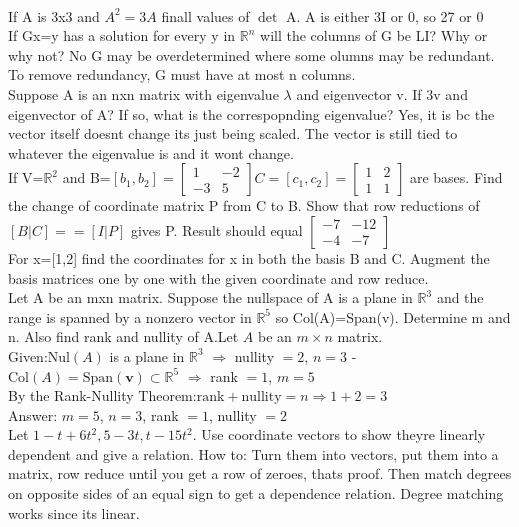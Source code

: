 \documentclass{article}
\begin{document}
\begin{multicols*}{2}
\\If A is 3x3 and $A^2=3A$ finall values of $\det$ A. A is either 3I or 0, so 27 or 0
\\If Gx=y has a solution for every y in $\mathbb{R}^n$ will the columns of G be LI? Why or why not? No G may be overdetermined where some olumns may be redundant. To remove redundancy, G must have at most n columns.
\\Suppose A is an nxn matrix with eigenvalue $\lambda$ and eigenvector v. If 3v and eigenvector of A? If so, what is the correspopnding eigenvalue? Yes, it is bc the vector itself doesnt change its just being scaled. The vector is still tied to whatever the eigenvalue is and it wont change.
\\If V=$\mathbb{R}^2$ and B=$[b_1,b_2]=\begin{bmatrix}1&-2\\-3&5\end{bmatrix}C=[c_1,c_2]=\begin{bmatrix}1&2\\1&1\end{bmatrix}$ are bases. Find the change of coordinate matrix P from C to B. Show that row reductions of $[B|C]==[I|P]$ gives P. Result should equal $\begin{bmatrix}-7&-12\\-4&-7\end{bmatrix}$
\\For x=[1,2] find the coordinates for x in both the basis B and C. Augment the basis matrices one by one with the given coordinate and row reduce.
\\Let A be an mxn matrix. Suppose the nullspace of A is a plane in $\mathbb{R}^3$ and the range is spanned by a nonzero vector in $\mathbb{R}^5$ so Col(A)=Span(v). Determine m and n. Also find rank and nullity of A.Let $A$ be an $m \times n$ matrix.\\
Given:$\text{Nul}(A)$ is a plane in $\mathbb{R}^3$ $\Rightarrow$ nullity $= 2$, $n = 3$
- $\text{Col}(A) = \text{Span}(\mathbf{v}) \subset \mathbb{R}^5$ $\Rightarrow$ rank $= 1$, $m = 5$
\\By the Rank-Nullity Theorem:$\text{rank} + \text{nullity} = n \Rightarrow 1 + 2 = 3$
\\Answer: $m = 5$, $n = 3$, rank $= 1$, nullity $= 2$
\\Let $1-t+6t^2, 5-3t, t-15t^2$. Use coordinate vectors to show theyre linearly dependent and give a relation. How to: Turn them into vectors, put them into a matrix, row reduce until you get a row of zeroes, thats proof. Then match degrees on opposite sides of an equal sign to get a dependence relation. Degree matching works since its linear.

\end{multicols*}
\end{document}
